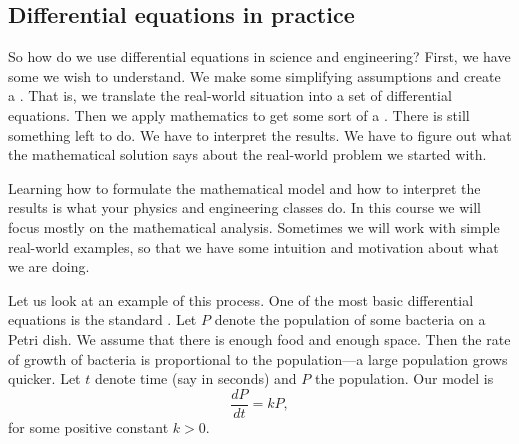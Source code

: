 \subsection{Differential equations in practice}

\begin{mywrapfigsimp}{3.05in}{3.35in}
\noindent
{}
\end{mywrapfigsimp}
So how do we use differential equations in science and engineering?  
First, we have some \emph{} we wish
to understand.
We make some simplifying assumptions and create a
\emph{}.
That is, we translate the real-world situation into a
set of differential equations.
Then we apply mathematics to get some sort of a
\emph{}.
There is still something left to do.  We have to interpret the results.
We have to figure out what the mathematical solution says about the real-world
problem we started with.

Learning how to formulate the mathematical model and how to interpret the
results is what your physics and engineering classes do.  In this
course we will focus mostly on the mathematical analysis.  Sometimes we will
work with simple real-world examples, so that we have some intuition and
motivation about what we are doing.

Let us look at 
an example of this process.
One of the most basic differential equations
is the standard \emph{}.
Let $P$ denote the population 
of some bacteria on a Petri dish.  We assume that there is enough food
and enough space.  Then the rate of growth of bacteria is proportional
to the population---a large population grows quicker.  Let $t$ denote
time (say in seconds) and $P$ the population.  Our model
is
\begin{equation*}
\frac{dP}{dt} = kP ,
\end{equation*}
for some positive constant $k > 0$.

